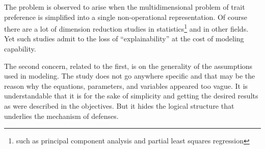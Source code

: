 The problem is observed to arise when the multidimensional problem of trait preference is simplified into a single non-operational representation.
Of course there are a lot of dimension reduction studies in statistics\footnote{such as principal component analysis and partial least squares regression} and in other fields.
Yet such studies admit to the loss of ``explainability'' at the cost of modeling capability.

The second concern, related to the first, is on the generality of the assumptions used in modeling.
The study does not go anywhere specific and that may be the reason why the equations, parameters, and variables appeared too vague.
It is understandable that it is for the sake of simplicity and getting the desired results as were described in the objectives.
But it hides the logical structure that underlies the mechanism of defenses.
